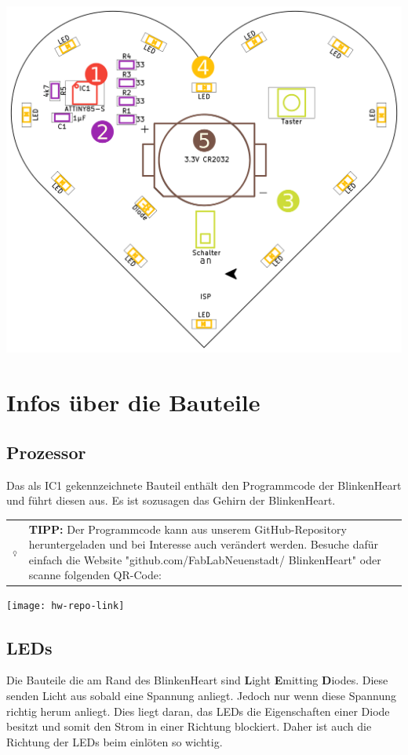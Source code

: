 \documentclass{article} %
\newcommand{\hintbox}[1]{
\begin{center}
	\begin{tabularx}{\linewidth}{
			>{\columncolor{hintbackground}}c
			>{\columncolor{hintbackground}}X}
		\raisebox{\dimexpr2\baselineskip-\height/2-\tabcolsep}
		{\includegraphics[width=1cm]{icons/002-technology}}&
		\raisebox{\tabcolsep}{\strut}\textbf{TIPP:} #1\raisebox{-\tabcolsep}{\strut}
	\end{tabularx}
\end{center}
}
\begin{document}
\begin{center}
	\includegraphics{pcb/solder_order}
\end{center}

\newpage
\section{Infos über die Bauteile}
\subsection{Prozessor}
Das als IC1 gekennzeichnete Bauteil enthält den Programmcode der BlinkenHeart und führt diesen aus. Es ist sozusagen das Gehirn der BlinkenHeart.

\hintbox{Der Programmcode kann aus unserem GitHub-Repository heruntergeladen und bei Interesse auch verändert werden. Besuche dafür einfach die Website "github.com/FabLabNeuenstadt/ BlinkenHeart" oder scanne folgenden QR-Code:}
\begin{center}
	\texttt{[image: hw-repo-link]}
\end{center}

\subsection{LEDs}
Die Bauteile die am Rand des BlinkenHeart sind
\textbf{L}ight \textbf{E}mitting \textbf{D}iodes.
Diese senden Licht aus sobald eine Spannung anliegt.
Jedoch nur wenn diese Spannung richtig herum anliegt.
Dies liegt daran, das LEDs die Eigenschaften einer Diode besitzt und
somit den Strom in einer Richtung blockiert.
Daher ist auch die Richtung der LEDs beim einlöten so wichtig.
\end{document}
